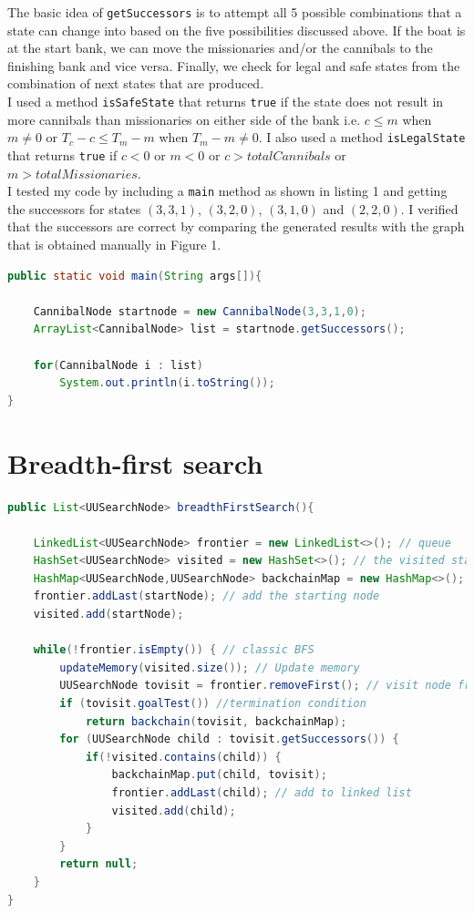 \documentclass[9.5pt]{extarticle}
\begin{document}
The basic idea of \verb`getSuccessors` is to attempt all 5 possible combinations that a state can change into based on the five possibilities discussed above. If the boat is at the start bank, we can move the missionaries and/or the cannibals to the finishing bank and vice versa. Finally, we check for legal and safe states from the combination of next states that are produced.\\

I used a method \verb`isSafeState` that returns \verb`true` if the state does not result in more cannibals than missionaries on either side of the bank i.e. $c\leq m$ when $m \neq 0$ or $T_c - c \leq T_m - m$ when $T_m - m \neq 0$. I also used a method \verb`isLegalState` that returns \verb`true` if $c < 0$ or $ m < 0$ or $c > totalCannibals$ or $m > totalMissionaries$.\\

I tested my code by including a  \verb`main` method as shown in listing 1 and getting the successors for states $(3,3,1)$, $(3,2,0)$, $(3,1,0)$ and $(2,2,0)$. I verified that the successors are correct by comparing the generated results with the graph that is obtained manually in Figure 1.

\begin{lstlisting}[language=java,caption={Java code for testing}]
public static void main(String args[]){

	CannibalNode startnode = new CannibalNode(3,3,1,0);
	ArrayList<CannibalNode> list = startnode.getSuccessors();

	for(CannibalNode i : list) 
		System.out.println(i.toString());
}
\end{lstlisting}

\section{Breadth-first search}

\begin{lstlisting}[language=java,caption={Java code for BFS}]
public List<UUSearchNode> breadthFirstSearch(){

	LinkedList<UUSearchNode> frontier = new LinkedList<>(); // queue
	HashSet<UUSearchNode> visited = new HashSet<>(); // the visited states
	HashMap<UUSearchNode,UUSearchNode> backchainMap = new HashMap<>(); // backchaining map
	frontier.addLast(startNode); // add the starting node
	visited.add(startNode);

	while(!frontier.isEmpty()) { // classic BFS
		updateMemory(visited.size()); // Update memory
		UUSearchNode tovisit = frontier.removeFirst(); // visit node from frontier
		if (tovisit.goalTest()) //termination condition
			return backchain(tovisit, backchainMap);
		for (UUSearchNode child : tovisit.getSuccessors()) {
			if(!visited.contains(child)) {
				backchainMap.put(child, tovisit);
				frontier.addLast(child); // add to linked list
				visited.add(child);
			}
		}
		return null;
	}
}
\end{lstlisting}
\end{document}
